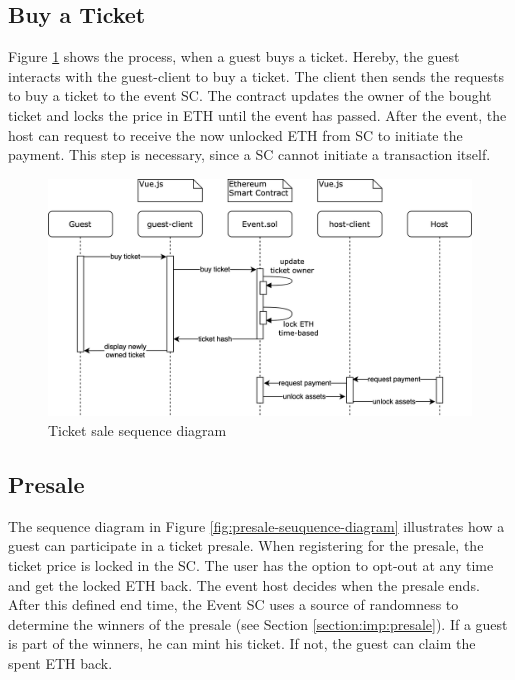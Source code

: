 \subsection{Buy a Ticket}
Figure \ref{fig:buyticket-sequence-diagram} shows the process, when a guest buys a ticket. Hereby, the guest interacts with the guest-client to buy a ticket. The client then sends the requests to buy a ticket to the event SC. The contract updates the owner of the bought ticket and locks the price in ETH until the event has passed. After the event, the host can request to receive the now unlocked ETH from SC to initiate the payment. This step is necessary, since a SC cannot initiate a transaction itself.
\begin{figure}[H]
    \centering
    \includegraphics[width=16cm]{design/diagrams/BuyTicket.png}
    \caption{Ticket sale sequence diagram}
    \label{fig:buyticket-sequence-diagram}
\end{figure}

\subsection{Presale}
The sequence diagram in Figure \ref{fig:presale-seuquence-diagram} illustrates how a guest can participate in a ticket presale. When registering for the presale, the ticket price is locked in the SC. The user has the option to opt-out at any time and get the locked ETH back. The event host decides when the presale ends. After this defined end time, the Event SC uses a source of randomness to determine the winners of the presale (see Section \ref{section:imp:presale}). If a guest is part of the winners, he can mint his ticket. If not, the guest can claim the spent ETH back.

